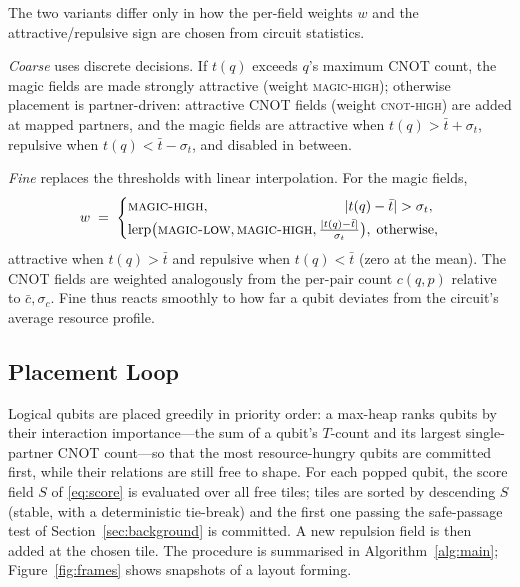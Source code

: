 \documentclass[10pt,conference]{IEEEtran}
\theoremstyle{definition}
\theoremstyle{remark}
\begin{document}
The two variants differ only in how the per-field weights $w$ and the
attractive/repulsive sign are chosen from circuit statistics.

\emph{Coarse} uses discrete decisions. If $t(q)$ exceeds $q$'s maximum CNOT
count, the magic fields are made strongly attractive (weight \textsc{magic-high});
otherwise placement is partner-driven: attractive CNOT fields (weight
\textsc{cnot-high}) are added at mapped partners, and the magic fields are
attractive when $t(q)>\bar t+\sigma_t$, repulsive when $t(q)<\bar t-\sigma_t$,
and disabled in between.

\emph{Fine} replaces the thresholds with linear interpolation. For the magic
fields,
\begin{equation*}
w \;=\;
\begin{cases}
\textsc{magic-high}, & \hspace{-1cm} |t(q)-\bar t|>\sigma_t,\\[2pt]
\mathrm{lerp}\big(\textsc{magic-low},\textsc{magic-high},\tfrac{|t(q)-\bar t|}{\sigma_t}\big), & \hspace{-0.2cm} \text{otherwise},
\end{cases}
\end{equation*}
attractive when $t(q)>\bar t$ and repulsive when $t(q)<\bar t$ (zero at the
mean). The CNOT fields are weighted analogously from the per-pair count
$c(q,p)$ relative to $\bar c,\sigma_c$. Fine thus reacts smoothly to how far a
qubit deviates from the circuit's average resource profile.

\subsection{Placement Loop}

Logical qubits are placed greedily in priority order: a max-heap ranks qubits by
their interaction importance---the sum of a qubit's $T$-count and its largest
single-partner CNOT count---so that the most resource-hungry qubits are committed
first, while their relations are still free to shape. For each popped qubit, the
score field $S$ of \eqref{eq:score} is evaluated over all free tiles; tiles are
sorted by descending $S$ (stable, with a deterministic tie-break) and the first
one passing the safe-passage test of Section~\ref{sec:background} is committed.
A new repulsion field is then added at the chosen tile. The procedure is
summarised in Algorithm~\ref{alg:main}; Figure~\ref{fig:frames} shows snapshots
of a layout forming.
\end{document}
